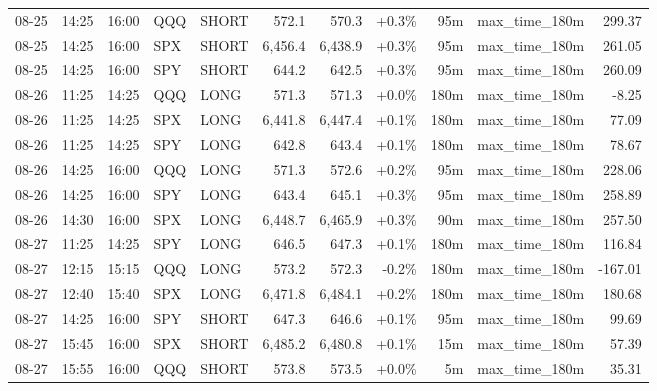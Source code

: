 \documentclass[11pt,a4paper,twoside]{article}
\begin{document}
\begin{center}
\begin{longtable}{>{\color{txtmain}}l l l l l r r r r >{\color{txtmain}}l r}
08-25 & 14:25 & 16:00 & QQQ & SHORT & 572.1 & 570.3 & \textcolor{wingreen}{+0.3\%} & 95m & max\_time\_180m & \textcolor{wingreen}{299.37} \\
08-25 & 14:25 & 16:00 & SPX & SHORT & 6,456.4 & 6,438.9 & \textcolor{wingreen}{+0.3\%} & 95m & max\_time\_180m & \textcolor{wingreen}{261.05} \\
08-25 & 14:25 & 16:00 & SPY & SHORT & 644.2 & 642.5 & \textcolor{wingreen}{+0.3\%} & 95m & max\_time\_180m & \textcolor{wingreen}{260.09} \\
08-26 & 11:25 & 14:25 & QQQ & LONG & 571.3 & 571.3 & \textcolor{wingreen}{+0.0\%} & 180m & max\_time\_180m & \textcolor{lossred}{-8.25} \\
08-26 & 11:25 & 14:25 & SPX & LONG & 6,441.8 & 6,447.4 & \textcolor{wingreen}{+0.1\%} & 180m & max\_time\_180m & \textcolor{wingreen}{77.09} \\
08-26 & 11:25 & 14:25 & SPY & LONG & 642.8 & 643.4 & \textcolor{wingreen}{+0.1\%} & 180m & max\_time\_180m & \textcolor{wingreen}{78.67} \\
08-26 & 14:25 & 16:00 & QQQ & LONG & 571.3 & 572.6 & \textcolor{wingreen}{+0.2\%} & 95m & max\_time\_180m & \textcolor{wingreen}{228.06} \\
08-26 & 14:25 & 16:00 & SPY & LONG & 643.4 & 645.1 & \textcolor{wingreen}{+0.3\%} & 95m & max\_time\_180m & \textcolor{wingreen}{258.89} \\
08-26 & 14:30 & 16:00 & SPX & LONG & 6,448.7 & 6,465.9 & \textcolor{wingreen}{+0.3\%} & 90m & max\_time\_180m & \textcolor{wingreen}{257.50} \\
08-27 & 11:25 & 14:25 & SPY & LONG & 646.5 & 647.3 & \textcolor{wingreen}{+0.1\%} & 180m & max\_time\_180m & \textcolor{wingreen}{116.84} \\
08-27 & 12:15 & 15:15 & QQQ & LONG & 573.2 & 572.3 & \textcolor{lossred}{-0.2\%} & 180m & max\_time\_180m & \textcolor{lossred}{-167.01} \\
08-27 & 12:40 & 15:40 & SPX & LONG & 6,471.8 & 6,484.1 & \textcolor{wingreen}{+0.2\%} & 180m & max\_time\_180m & \textcolor{wingreen}{180.68} \\
08-27 & 14:25 & 16:00 & SPY & SHORT & 647.3 & 646.6 & \textcolor{wingreen}{+0.1\%} & 95m & max\_time\_180m & \textcolor{wingreen}{99.69} \\
08-27 & 15:45 & 16:00 & SPX & SHORT & 6,485.2 & 6,480.8 & \textcolor{wingreen}{+0.1\%} & 15m & max\_time\_180m & \textcolor{wingreen}{57.39} \\
08-27 & 15:55 & 16:00 & QQQ & SHORT & 573.8 & 573.5 & \textcolor{wingreen}{+0.0\%} & 5m & max\_time\_180m & \textcolor{wingreen}{35.31} \\

\end{longtable}
\end{center}
\end{document}
